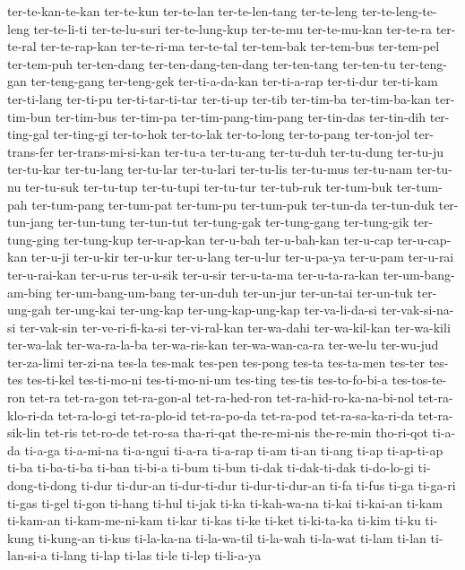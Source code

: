 {ter-te-kan-te-kan ter-te-kun ter-te-lan ter-te-len-tang ter-te-leng
ter-te-leng-te-leng ter-te-li-ti ter-te-lu-suri ter-te-lung-kup ter-te-mu
ter-te-mu-kan ter-te-ra ter-te-ral ter-te-rap-kan ter-te-ri-ma ter-te-tal
ter-tem-bak ter-tem-bus ter-tem-pel ter-tem-puh ter-ten-dang
ter-ten-dang-ten-dang ter-ten-tang ter-ten-tu ter-teng-gan ter-teng-gang
ter-teng-gek ter-ti-a-da-kan ter-ti-a-rap ter-ti-dur ter-ti-kam
ter-ti-lang ter-ti-pu ter-ti-tar-ti-tar ter-ti-up ter-tib ter-tim-ba
ter-tim-ba-kan ter-tim-bun ter-tim-bus ter-tim-pa ter-tim-pang-tim-pang
ter-tin-das ter-tin-dih ter-ting-gal ter-ting-gi ter-to-hok ter-to-lak
ter-to-long ter-to-pang ter-ton-jol ter-trans-fer ter-trans-mi-si-kan
ter-tu-a ter-tu-ang ter-tu-duh ter-tu-dung ter-tu-ju ter-tu-kar
ter-tu-lang ter-tu-lar ter-tu-lari ter-tu-lis ter-tu-mus ter-tu-nam
ter-tu-nu ter-tu-suk ter-tu-tup ter-tu-tupi ter-tu-tur ter-tub-ruk
ter-tum-buk ter-tum-pah ter-tum-pang ter-tum-pat ter-tum-pu ter-tum-puk
ter-tun-da ter-tun-duk ter-tun-jang ter-tun-tung ter-tun-tut ter-tung-gak
ter-tung-gang ter-tung-gik ter-tung-ging ter-tung-kup ter-u-ap-kan
ter-u-bah ter-u-bah-kan ter-u-cap ter-u-cap-kan ter-u-ji ter-u-kir
ter-u-kur ter-u-lang ter-u-lur ter-u-pa-ya ter-u-pam ter-u-rai
ter-u-rai-kan ter-u-rus ter-u-sik ter-u-sir ter-u-ta-ma ter-u-ta-ra-kan
ter-um-bang-am-bing ter-um-bang-um-bang ter-un-duh ter-un-jur ter-un-tai
ter-un-tuk ter-ung-gah ter-ung-kai ter-ung-kap ter-ung-kap-ung-kap
ter-va-li-da-si ter-vak-si-na-si ter-vak-sin ter-ve-ri-fi-ka-si
ter-vi-ral-kan ter-wa-dahi ter-wa-kil-kan ter-wa-kili ter-wa-lak
ter-wa-ra-la-ba ter-wa-ris-kan ter-wa-wan-ca-ra ter-we-lu ter-wu-jud
ter-za-limi ter-zi-na tes-la tes-mak tes-pen tes-pong tes-ta tes-ta-men
tes-ter tes-tes tes-ti-kel tes-ti-mo-ni tes-ti-mo-ni-um tes-ting tes-tis
tes-to-fo-bi-a tes-tos-te-ron tet-ra tet-ra-gon tet-ra-gon-al
tet-ra-hed-ron tet-ra-hid-ro-ka-na-bi-nol tet-ra-klo-ri-da tet-ra-lo-gi
tet-ra-plo-id tet-ra-po-da tet-ra-pod tet-ra-sa-ka-ri-da tet-ra-sik-lin
tet-ris tet-ro-de tet-ro-sa tha-ri-qat the-re-mi-nis the-re-min tho-ri-qot
ti-a-da ti-a-ga ti-a-mi-na ti-a-ngui ti-a-ra ti-a-rap ti-am ti-an ti-ang
ti-ap ti-ap-ti-ap ti-ba ti-ba-ti-ba ti-ban ti-bi-a ti-bum ti-bun ti-dak
ti-dak-ti-dak ti-do-lo-gi ti-dong-ti-dong ti-dur ti-dur-an ti-dur-ti-dur
ti-dur-ti-dur-an ti-fa ti-fus ti-ga ti-ga-ri ti-gas ti-gel ti-gon ti-hang
ti-hul ti-jak ti-ka ti-kah-wa-na ti-kai ti-kai-an ti-kam ti-kam-an
ti-kam-me-ni-kam ti-kar ti-kas ti-ke ti-ket ti-ki-ta-ka ti-kim ti-ku
ti-kung ti-kung-an ti-kus ti-la-ka-na ti-la-wa-til ti-la-wah ti-la-wat
ti-lam ti-lan ti-lan-si-a ti-lang ti-lap ti-las ti-le ti-lep ti-li-a-ya
}
